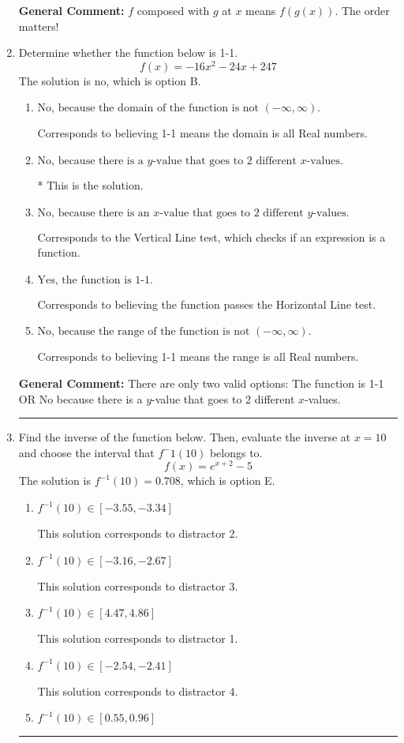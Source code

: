 \documentclass{extbook}[14pt]
\newcommand{\litem}[1]{\item #1

\rule{\textwidth}{0.4pt}}
\begin{document}
\begin{enumerate}
{\textbf{General Comment:} $f$ composed with $g$ at $x$ means $f(g(x))$. The order matters!
}
\litem{
Determine whether the function below is 1-1.
\[ f(x) = -16 x^2 - 24 x + 247 \]The solution is \( \text{no} \), which is option B.\begin{enumerate}[label=\Alph*.]
\item \( \text{No, because the domain of the function is not $(-\infty, \infty)$.} \)

Corresponds to believing 1-1 means the domain is all Real numbers.
\item \( \text{No, because there is a $y$-value that goes to 2 different $x$-values.} \)

* This is the solution.
\item \( \text{No, because there is an $x$-value that goes to 2 different $y$-values.} \)

Corresponds to the Vertical Line test, which checks if an expression is a function.
\item \( \text{Yes, the function is 1-1.} \)

Corresponds to believing the function passes the Horizontal Line test.
\item \( \text{No, because the range of the function is not $(-\infty, \infty)$.} \)

Corresponds to believing 1-1 means the range is all Real numbers.
\end{enumerate}

\textbf{General Comment:} There are only two valid options: The function is 1-1 OR No because there is a $y$-value that goes to 2 different $x$-values.
}
\litem{
Find the inverse of the function below. Then, evaluate the inverse at $x = 10$ and choose the interval that $f^-1(10)$ belongs to.
\[ f(x) = e^{x+2}-5 \]The solution is \( f^{-1}(10) = 0.708 \), which is option E.\begin{enumerate}[label=\Alph*.]
\item \( f^{-1}(10) \in [-3.55, -3.34] \)

 This solution corresponds to distractor 2.
\item \( f^{-1}(10) \in [-3.16, -2.67] \)

 This solution corresponds to distractor 3.
\item \( f^{-1}(10) \in [4.47, 4.86] \)

 This solution corresponds to distractor 1.
\item \( f^{-1}(10) \in [-2.54, -2.41] \)

 This solution corresponds to distractor 4.
\item \( f^{-1}(10) \in [0.55, 0.96] \)


\end{enumerate}}
\end{enumerate}
\end{document}
